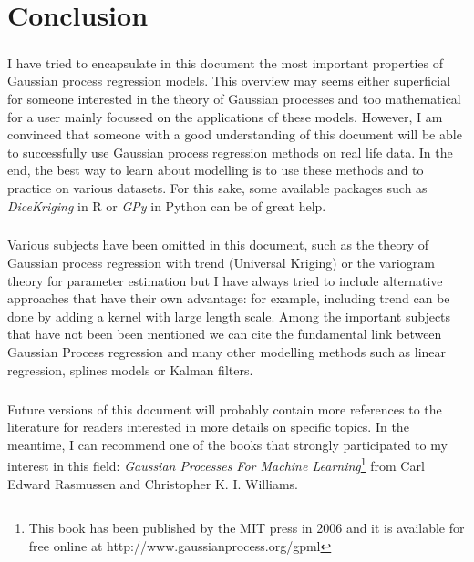 \documentclass[twoside,openright]{report}
\begin{document}
\chapter*{Conclusion}

\paragraph{}
I have tried to encapsulate in this document the most important properties of Gaussian process regression models. This overview may seems either superficial for someone interested in the theory of Gaussian processes and too mathematical for a user mainly focussed on the applications of these models. However, I am convinced that someone with a good understanding of this document will be able to successfully use Gaussian process regression methods on real life data. In the end, the best way to learn about modelling is to use these methods and to practice on various datasets. For this sake, some available packages such as \emph{DiceKriging} in R or \emph{GPy} in Python can be of great help. 

\paragraph{}
Various subjects have been omitted in this document, such as the theory of Gaussian process regression with trend (Universal Kriging) or the variogram theory for parameter estimation but I have always tried to include alternative approaches that have their own advantage: for example, including trend can be done by adding a kernel with large length scale. Among the important subjects that have not been been mentioned we can cite the fundamental link between Gaussian Process regression and many other modelling methods such as linear regression, splines models or Kalman filters.

\paragraph{}
Future versions of this document will probably contain more references to the literature for readers interested in more details on specific topics. In the meantime, I can recommend one of the books that strongly participated to my interest in this field: \emph{Gaussian Processes For Machine Learning}\footnote{This book has been published by the MIT press in 2006 and it is available for free online at http://www.gaussianprocess.org/gpml} from Carl Edward Rasmussen and Christopher K. I. Williams.
\end{document}
